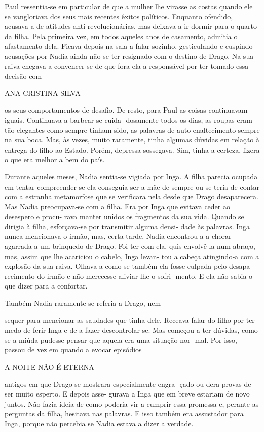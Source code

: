 Paul ressentia‑se em particular de que a mulher lhe virasse as costas
quando ele se vangloriava dos seus mais recentes êxitos políticos.
Enquanto ofendido, acusava‑a de atitudes anti‑revolucionárias, mas
deixava‑a ir dormir para o quarto da filha. Pela primeira vez, em todos
aqueles anos de casamento, admitia o afastamento dela. Ficava depois na
sala a falar sozinho, gesticulando e cuspindo acusações por Nadia ainda
não se ter resignado com o destino de Drago. Na sua raiva chegava a
convencer‑se de que fora ela a responsável por ter tomado essa decisão
com

ANA CRISTINA SILVA

os seus comportamentos de desafio. De resto, para Paul as coisas
continuavam iguais. Continuava a barbear‑se cuida‑ dosamente todos os
dias, as roupas eram tão elegantes como sempre tinham sido, as palavras
de auto‑enaltecimento sempre na sua boca. Mas, às vezes, muito
raramente, tinha algumas dúvidas em relação à entrega do filho ao
Estado. Porém, depressa sossegava. Sim, tinha a certeza, fizera o que
era melhor a bem do país.

Durante aqueles meses, Nadia sentia‑se vigiada por Inga. A filha parecia
ocupada em tentar compreender se ela conseguia ser a mãe de sempre ou se
teria de contar com a estranha metamorfose que se verificara nela desde
que Drago desaparecera. Mas Nadia preocupava‑se com a filha. Era por
Inga que evitava ceder ao desespero e procu‑ rava manter unidos os
fragmentos da sua vida. Quando se dirigia à filha, esforçava‑se por
transmitir alguma densi‑ dade às palavras. Inga nunca mencionava o
irmão, mas, certa tarde, Nadia encontrou‑a a chorar agarrada a um
brinquedo de Drago. Foi ter com ela, quis envolvê‑la num abraço, mas,
assim que lhe acariciou o cabelo, Inga levan‑ tou a cabeça atingindo‑a
com a explosão da sua raiva. Olhava‑a como se também ela fosse culpada
pelo desapa‑ recimento do irmão e não merecesse aliviar‑lhe o sofri‑
mento. E ela não sabia o que dizer para a confortar.

Também Nadia raramente se referia a Drago, nem

sequer para mencionar as saudades que tinha dele. Receava falar do filho
por ter medo de ferir Inga e de a fazer descontrolar‑se. Mas começou a
ter dúvidas, como se a miúda pudesse pensar que aquela era uma situação
nor‑ mal. Por isso, passou de vez em quando a evocar episódios

A NOITE NÃO É ETERNA

antigos em que Drago se mostrara especialmente engra‑ çado ou dera
provas de ser muito esperto. E depois asse‑ gurava a Inga que em breve
estariam de novo juntos. Não fazia ideia de como poderia vir a cumprir
essa promessa e, perante as perguntas da filha, hesitava nas palavras. E
isso também era assustador para Inga, porque não percebia se Nadia
estava a dizer a verdade.

